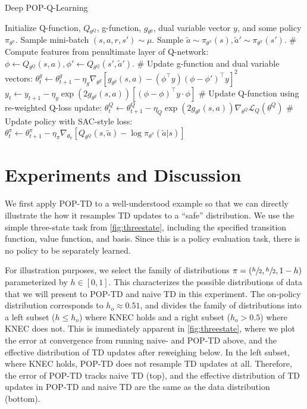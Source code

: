 \begin{algorithm}[tb]
  \caption{Deep POP-Q-Learning}
  \label{alg:example}
  \begin{algorithmic}
    \STATE  Initialize Q-function, $Q_{\theta^Q}$, g-function, $g_{\theta^g}$, dual variable vector $y$, and some policy $\pi_{\theta^\pi}$.
    \STATE Sample mini-batch $(s, a, r, s') \sim \mu$.
    \STATE Sample $\tilde{a} \sim \pi_{\theta^\pi}(s), \tilde{a}' \sim \pi_{\theta^\pi}(s')$.
    \STATE \# Compute features from penultimate layer of Q-network:
    \STATE $\phi \gets Q_{\theta^Q}(s, a), \phi' \gets Q_{\theta^Q}(s', \tilde{a}')$.
    \STATE \# Update g-function and dual variable vectors:
    \STATE $\theta^g_t \gets \theta^g_{t+1} - \eta_g \nabla_{\theta^g} [g_{\theta^g}(s, a) - (\phi^\top y) (\phi - \phi')^\top y]^2$
    \STATE $y_t \gets y_{t+1} - \eta_y \exp (2 g_{\theta^g}(s, a)) [(\phi - \phi)^\top y \cdot \phi]$
    \STATE \# Update Q-function using re-weighted Q-loss update:
    \STATE $\theta^Q_t \gets \theta^Q_{t+1} - \eta_Q \exp (2 g_{\theta^g}(s, a)) \nabla_{\theta^Q} \mathcal{L}_Q(\theta^Q)$
    \STATE \# Update policy with SAC-style loss:
    \STATE $\theta^\pi_t \gets \theta^\pi_{t+1} - \eta_\pi \nabla_{\theta_\pi} [Q_{\theta^Q}(s, \tilde{a}) - \log \pi_{\theta^\pi}(\tilde{a} | s)]$
    \ENDFOR
  \end{algorithmic}
\end{algorithm}

\section{Experiments and Discussion}

We first apply POP-TD to a well-understood example so that we can directly illustrate the how it resamples TD updates to a ``safe'' distribution. We use the simple three-state task from \cref{fig:threestate}, including the specified transition function, value function, and basis. Since this is a policy evaluation task, there is no policy to be separately learned.

For illustration purposes, we select the family of distributions $\pi = (\sfrac h 2, \sfrac h 2, 1- h)$ parameterized by $h \in [0, 1]$.
This characterizes the possible distributions of data that we will present to POP-TD and naive TD in this experiment. The on-policy distribution corresponds to $h_o\approx 0.51$, and divides the family of distributions into a left subset ($h \leq h_o$) where KNEC holds and a right subset ($h_o > 0.5$) where KNEC does not. This is immediately apparent in \cref{fig:threestate}, where we plot the error at convergence from running naive- and POP-TD above, and the effective distribution of TD updates after reweighing below.
In the left subset, where KNEC holds, POP-TD does not resample TD updates at all. Therefore, the error of POP-TD tracks naive TD (top), and the effective distribution of TD updates in POP-TD and naive TD are the same as the data distribution (bottom).

